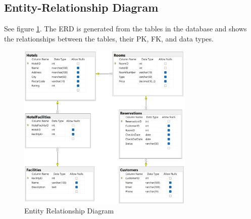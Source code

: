 \pagebreak

\subsection{Entity-Relationship Diagram}
See figure \ref*{fig:entity-relationship-diagram}. 
The ERD is generated from the tables in the database and shows the relationships between the tables, their PK, FK, and data types.

\begin{figure}
  \centering
  \includegraphics[width=0.75\textwidth]{figures/SWD_ERD_HotelManagement.png}
  \caption{Entity Relationship Diagram}
  \label{fig:entity-relationship-diagram}
\end{figure}